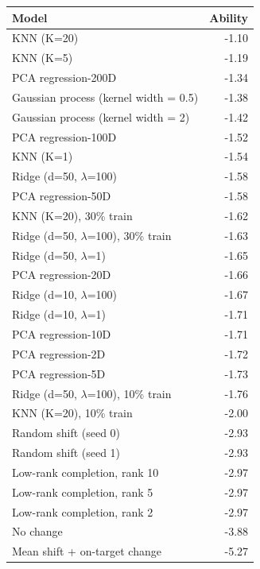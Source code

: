 \begin{tabular}{@{}lr@{}}
\toprule
Model & Ability \\
\midrule
KNN (K=20) & -1.10 \\
KNN (K=5) & -1.19 \\
PCA regression-200D & -1.34 \\
Gaussian process (kernel width = 0.5) & -1.38 \\
Gaussian process (kernel width = 2) & -1.42 \\
PCA regression-100D & -1.52 \\
KNN (K=1) & -1.54 \\
Ridge (d=50, $\lambda$=100) & -1.58 \\
PCA regression-50D & -1.58 \\
KNN (K=20), 30\% train & -1.62 \\
Ridge (d=50, $\lambda$=100), 30\% train & -1.63 \\
Ridge (d=50, $\lambda$=1) & -1.65 \\
PCA regression-20D & -1.66 \\
Ridge (d=10, $\lambda$=100) & -1.67 \\
Ridge (d=10, $\lambda$=1) & -1.71 \\
PCA regression-10D & -1.71 \\
PCA regression-2D & -1.72 \\
PCA regression-5D & -1.73 \\
Ridge (d=50, $\lambda$=100), 10\% train & -1.76 \\
KNN (K=20), 10\% train & -2.00 \\
Random shift (seed 0) & -2.93 \\
Random shift (seed 1) & -2.93 \\
Low-rank completion, rank 10 & -2.97 \\
Low-rank completion, rank 5 & -2.97 \\
Low-rank completion, rank 2 & -2.97 \\
No change & -3.88 \\
Mean shift + on-target change & -5.27 \\
\bottomrule
\end{tabular}
